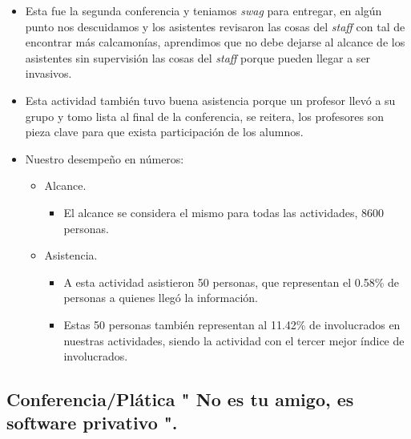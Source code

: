 \documentclass[a4paper,11pt]{article}                 %
\begin{document}
    \begin{itemize}
    \item Esta fue la segunda conferencia y teniamos \textit{swag} para entregar, en algún punto nos descuidamos y los asistentes revisaron las cosas del \textit{staff} con tal de encontrar más calcamonías, aprendimos que no debe dejarse al alcance de los asistentes sin supervisión las cosas del \textit{staff} porque pueden llegar a ser invasivos.
    \item Esta actividad también tuvo buena asistencia porque un profesor llevó a su grupo y tomo lista al final de la conferencia, se reitera, los profesores son pieza clave para que exista participación de los alumnos.
    
    \item Nuestro desempeño en números:
    
    \begin{itemize}
    \item Alcance.
    \begin{itemize}
      \item El alcance se considera el mismo para todas las actividades, 8600 personas.
    \end{itemize}

    \item Asistencia.
    \begin{itemize}
      \item A esta actividad asistieron 50 personas, que representan el 0.58\% de personas a quienes llegó la información.
      \item Estas 50 personas también representan al 11.42\%  de involucrados en nuestras actividades, siendo la actividad con el tercer mejor índice de involucrados. 
    \end{itemize}
    \end{itemize} 
    
  \end{itemize}
  \subsection{Conferencia/Plática " No es tu amigo, es software privativo ".}  
  
\end{document}
